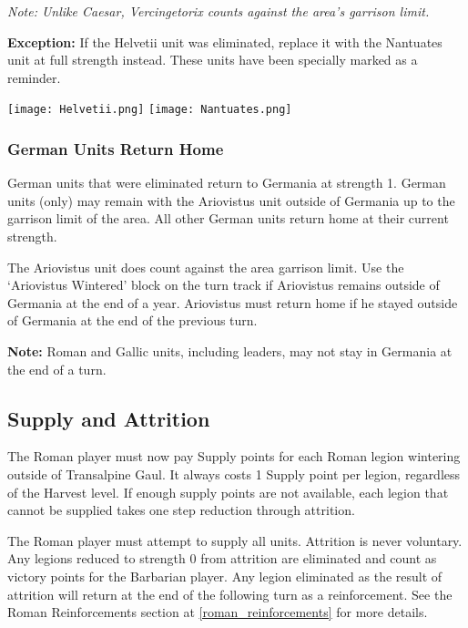 \textit{Note: Unlike Caesar, Vercingetorix counts against the area's garrison limit.}

\textbf{Exception:} If the Helvetii unit was eliminated, replace it with the Nantuates unit at full strength instead. These units have been specially marked as a reminder.

\begin{center}
  \texttt{[image: Helvetii.png]}
  \hspace{1mm}
  \texttt{[image: Nantuates.png]}
\end{center}

\subsubsection{German Units Return Home}
\label{german_units_return_home}
\par
German units that were eliminated return to Germania at strength 1. German units (only) may remain with the Ariovistus unit outside of Germania up to the garrison limit of the area. All other German units return home at their current strength.

The Ariovistus unit does count against the area garrison limit. Use the ‘Ariovistus Wintered’ block on the turn track if Ariovistus remains outside of Germania at the end of a year. Ariovistus must return home if he stayed outside of Germania at the end of the previous turn.

\textbf{Note:} Roman and Gallic units, including leaders, may not stay in Germania at the end of a turn.

\subsection{Supply and Attrition}
\label{supply_and_attrition}
\par
The Roman player must now pay Supply points for each Roman legion wintering outside of Transalpine Gaul. It always costs 1 Supply point per legion, regardless of the Harvest level. If enough supply points are not available, each legion that cannot be supplied takes one step reduction through attrition.

The Roman player must attempt to supply all units. Attrition is never voluntary. Any legions reduced to strength 0 from attrition are eliminated and count as victory points for the Barbarian player. Any legion eliminated as the result of attrition will return at the end of the following turn as a reinforcement. See the Roman Reinforcements section at \ref{roman_reinforcements} for more details.


